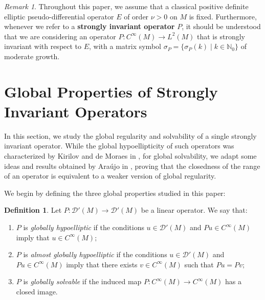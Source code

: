 \documentclass{amsart}
\theoremstyle{definition}
\newtheorem{definition}[theorem]{Definition}
\theoremstyle{remark}
\newtheorem{remark}[theorem]{Remark}
\numberwithin{equation}{section}
\begin{document}
	\begin{remark}
		Throughout this paper, we assume that a classical positive definite elliptic pseudo-differential operator $E$ of order $\nu > 0$ on $M$ is fixed. Furthermore, whenever we refer to a \textbf{strongly invariant operator} $P$, it should be understood that we are considering an operator $P:C^\infty(M)\to L^2(M)$ that is strongly invariant with respect to $E$, with a matrix symbol $\sigma_P = \{\sigma_P(k) \mid k\in \mathbb{N}_0 \}$ of moderate growth.
	\end{remark}
	
	
	\section{Global Properties of Strongly Invariant Operators}
	
	In this section, we study the global regularity and solvability of a single strongly invariant operator. While the global hypoellipticity of such operators was characterized by Kirilov and de Moraes in \cite{KM2020}, for global solvability, we adapt some ideas and results obtained by Araújo in \cite{Araujo2019}, proving that the closedness of the range of an operator is equivalent to a weaker version of global regularity.
	
	We begin by defining the three global properties studied in this paper:
	
	\begin{definition}\label{global-prop-operators}
		Let $P:\mathscr{D}'(M)\to \mathscr{D}'(M)$ be a linear operator. We say that:
		\begin{enumerate}
			\item $P$ is \textit{globally hypoelliptic} if the conditions $u\in\mathscr{D}'(M)$ and $Pu\in C^\infty(M)$ imply that $u\in C^\infty(M);$
			\item $P$ is \textit{almost globally hypoelliptic} if the conditions $u\in\mathscr{D}'(M)$ and $Pu\in C^\infty(M)$ imply that there exists $v\in C^\infty(M)$ such that $Pu=Pv;$ 
			\item $P$ is \textit{globally solvable} if the induced map $P:C^\infty(M)\to C^\infty(M)$ has a closed image.
		\end{enumerate}
	\end{definition}
	
\end{document}
